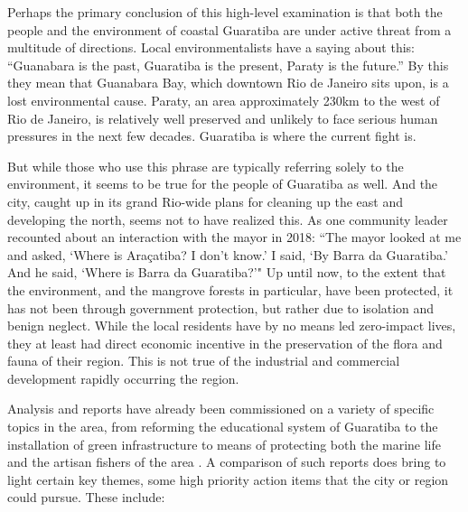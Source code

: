 
Perhaps the primary conclusion of this high-level examination is that both the people and the environment of coastal Guaratiba are under active threat from a multitude of directions. Local environmentalists have a saying about this: “Guanabara is the past, Guaratiba is the present, Paraty is the future.” By this they mean that Guanabara Bay, which downtown Rio de Janeiro sits upon, is a lost environmental cause. Paraty, an area approximately 230km to the west of Rio de Janeiro, is relatively well preserved and unlikely to face serious human pressures in the next few decades. Guaratiba is where the current fight is. 

But while those who use this phrase are typically referring solely to the environment, it seems to be true for the people of Guaratiba as well. And the city, caught up in its grand Rio-wide plans for cleaning up the east and developing the north, seems not to have realized this. As one community leader recounted about an interaction with the mayor in 2018: ``The mayor looked at me and asked, `Where is Araçatiba? I don’t know.’ I said, `By Barra da Guaratiba.’ And he said, `Where is Barra da Guaratiba?'" \cite{stroblFollowingRecentEviction2018} Up until now, to the extent that the environment, and the mangrove forests in particular, have been protected, it has not been through government protection, but rather due to isolation and benign neglect. While the local residents have by no means led zero-impact lives, they at least had direct economic incentive in the preservation of the flora and fauna of their region. This is not true of the industrial and commercial development rapidly occurring the region.

Analysis and reports have already been commissioned on a variety of specific topics in the area, from reforming the educational system of Guaratiba \cite{pizzolatoLOCALIZACAOESCOLASPUBLICAS2013} to the installation of green infrastructure \cite{herzogGuaratibaVerdeSubsidios2009} to means of protecting both the marine life and the artisan fishers of the area \cite{lopesTerritorialidadesEmConflitos2013}. A comparison of such reports does bring to light certain key themes, some high priority action items that the city or region could pursue. These include:

